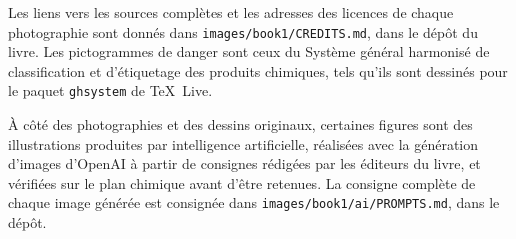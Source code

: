 Les liens vers les sources complètes et les adresses des licences de
chaque photographie sont donnés dans
\texttt{images/book1/CREDITS.md}, dans le dépôt du livre. Les
pictogrammes de danger sont ceux du Système général harmonisé de
classification et d'étiquetage des produits chimiques, tels qu'ils sont
dessinés pour le paquet \texttt{ghsystem} de \TeX\ Live.

\bigskip
À côté des photographies et des dessins originaux, certaines figures
sont des illustrations produites par intelligence artificielle, réalisées
avec la génération d'images d'OpenAI à partir de consignes rédigées par
les éditeurs du livre, et vérifiées sur le plan chimique avant d'être
retenues. La consigne complète de chaque image générée est consignée
dans \texttt{images/book1/ai/PROMPTS.md}, dans le dépôt.
\clearpage
